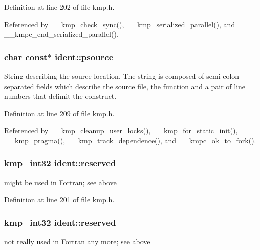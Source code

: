 Definition at line 202 of file kmp.\-h.



Referenced by \-\_\-\-\_\-kmp\-\_\-check\-\_\-sync(), \-\_\-\-\_\-kmp\-\_\-serialized\-\_\-parallel(), and \-\_\-\-\_\-kmpc\-\_\-end\-\_\-serialized\-\_\-parallel().

\hypertarget{structident_a8c2ccc106967f36d7191d59d4d5a65dc}{
\subsubsection[{psource}]{\setlength{\rightskip}{0pt plus 5cm}char const$\ast$ ident\-::psource}}\label{structident_a8c2ccc106967f36d7191d59d4d5a65dc}
String describing the source location. The string is composed of semi-\/colon separated fields which describe the source file, the function and a pair of line numbers that delimit the construct. 

Definition at line 209 of file kmp.\-h.



Referenced by \-\_\-\-\_\-kmp\-\_\-cleanup\-\_\-user\-\_\-locks(), \-\_\-\-\_\-kmp\-\_\-for\-\_\-static\-\_\-init(), \-\_\-\-\_\-kmp\-\_\-pragma(), \-\_\-\-\_\-kmp\-\_\-track\-\_\-dependence(), and \-\_\-\-\_\-kmpc\-\_\-ok\-\_\-to\-\_\-fork().

\hypertarget{structident_a8a098c07080704af1d89e401a1b4d10f}{
\subsubsection[{reserved\-\_\-1}]{\setlength{\rightskip}{0pt plus 5cm}kmp\-\_\-int32 ident\-::reserved\-\_}}\label{structident_a8a098c07080704af1d89e401a1b4d10f}
might be used in Fortran; see above 

Definition at line 201 of file kmp.\-h.

\hypertarget{structident_a91db2d18476e0a527ba20e04ca2c3e74}{
\subsubsection[{reserved\-\_\-2}]{\setlength{\rightskip}{0pt plus 5cm}kmp\-\_\-int32 ident\-::reserved\-\_}}\label{structident_a91db2d18476e0a527ba20e04ca2c3e74}
not really used in Fortran any more; see above 

